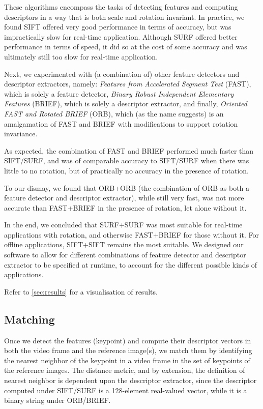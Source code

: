 \documentclass[11pt]{article} %
\theoremstyle{plain}
\theoremstyle{definition}
\theoremstyle{remark}
\numberwithin{equation}{section} %
\numberwithin{figure}{section} %
\numberwithin{table}{section} %
\begin{document}
These algorithms encompass the tasks of detecting features and computing descriptors
in a way that is both scale and rotation invariant. In practice, we found SIFT offered
very good performance in terms of accuracy, but was impractically slow for real-time 
application. Although SURF offered better performance in terms of speed, it did so at
the cost of some accuracy and was ultimately still too slow for real-time application.

Next, we experimented with (a combination of) other feature detectors and descriptor 
extractors, namely: \emph{Features from Accelerated Segment Test} \citep{Rosten2006} (FAST), 
which is solely a feature detector, \emph{Binary Robust Independent Elementary Features} 
\citep{Calonder2010} (BRIEF), which is solely a descriptor extractor, and finally, 
\emph{Oriented FAST and Rotated BRIEF} \citep{Rublee2011} (ORB), which (as the name suggests) 
is an amalgamation of FAST and BRIEF with modifications to support rotation invariance.

As expected, the combination of FAST and BRIEF performed much faster than SIFT/SURF,
and was of comparable accuracy to SIFT/SURF when there was little to no rotation, but
of practically no accuracy in the presence of rotation. 

To our dismay, we found that ORB+ORB (the combination of ORB as both a feature detector 
and descriptor extractor), while still very fast, was not more accurate than FAST+BRIEF 
in the presence of rotation, let alone without it.

In the end, we concluded that SURF+SURF was most suitable for real-time applications with
rotation, and otherwise FAST+BRIEF for those without it. For offline applications,
SIFT+SIFT remains the most suitable. We designed our software to allow for different  
combinations of feature detector and descriptor extractor to be specified at runtime,
to account for the different possible kinds of applications.

Refer to \cref{sec:results} for a visualisation of results.

\subsection{Matching}

Once we detect the features (keypoint) and compute their descriptor vectors in both the 
video frame and the reference image(s), we match them by identifying the nearest neighbor 
of the keypoint in a video frame in the set of keypoints of the reference images. The
distance metric, and by extension, the definition of nearest neighbor is dependent upon the 
descriptor extractor, since the descriptor computed under SIFT/SURF is a 128-element 
real-valued vector, while it is a binary string under ORB/BRIEF.
\end{document}
